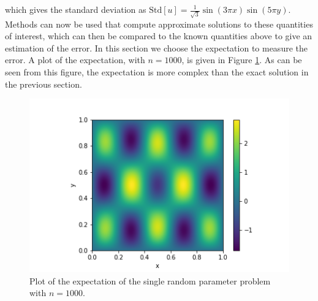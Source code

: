 \documentclass[11pt]{article}
\numberwithin{equation}{section}
\begin{document}
which gives the standard deviation as $\text{Std}[u] = \frac{1}{\sqrt{3}} \sin(3 \pi x) \sin(5 \pi y)$. Methods can now be used that compute approximate solutions to these quantities of interest, which can then be compared to the known quantities above to give an estimation of the error. In this section we choose the expectation to measure the error. A plot of the expectation, with $n=1000$, is given in Figure \ref{fig:single}. As can be seen from this figure, the expectation is more complex than the exact solution in the previous section.

\begin{figure}[H]
\includegraphics[scale=.7]{img/single.png}
\centering
\caption{Plot of the expectation of the single random parameter problem with $n=1000$.}
\label{fig:single}
\end{figure} 
\end{document}
